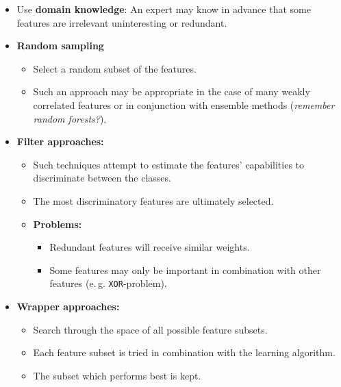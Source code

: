 \begin{frame}
	\begin{itemize}
		\item Use \textbf{domain knowledge}: An expert may know in advance that some features are irrelevant uninteresting or redundant.
		\item \textbf{Random sampling}
		\begin{itemize}
			\item Select a random subset of the features.
			\item Such an approach may be appropriate in the case of many weakly correlated features or in conjunction with ensemble methods (\textit{remember random forests?}).
		\end{itemize}
	\end{itemize}
\end{frame}


\begin{frame}
	\begin{itemize}
		\item \textbf{Filter approaches:}
		\begin{itemize}
			\item Such techniques attempt to estimate the features' capabilities to discriminate between the classes.
			\item The most discriminatory features are ultimately selected.
			\item \textbf{Problems:}
			\begin{itemize}
				\item Redundant features will receive similar weights.
				\item Some features may only be important in combination with other features (e.\,g. \texttt{XOR}-problem).
			\end{itemize}
		\end{itemize}
		\item \textbf{Wrapper approaches:}
		\begin{itemize}
			\item Search through the space of all possible feature subsets.
			\item Each feature subset is tried in combination with the learning algorithm.
			\item The subset which performs best is kept.
		\end{itemize}
	\end{itemize}
\end{frame}


